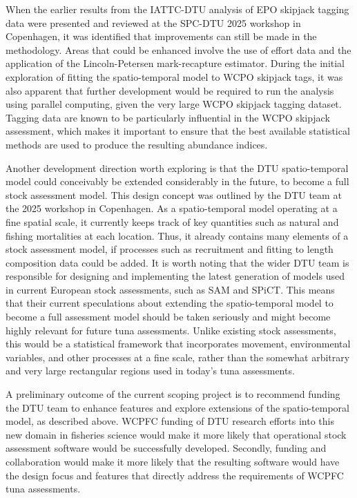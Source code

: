 \documentclass{SCreport}
\begin{document}
When the earlier results from the IATTC-DTU analysis of EPO skipjack tagging
data were presented and reviewed at the SPC-DTU 2025 workshop in Copenhagen, it
was identified that improvements can still be made in the methodology. Areas
that could be enhanced involve the use of effort data and the application of the
Lincoln-Petersen mark-recapture estimator. During the initial exploration of
fitting the spatio-temporal model to WCPO skipjack tags, it was also apparent
that further development would be required to run the analysis using parallel
computing, given the very large WCPO skipjack tagging dataset. Tagging data are
known to be particularly influential in the WCPO skipjack assessment, which
makes it important to ensure that the best available statistical methods are
used to produce the resulting abundance indices.

Another development direction worth exploring is that the DTU spatio-temporal
model could conceivably be extended considerably in the future, to become a full
stock assessment model. This design concept was outlined by the DTU team at the
2025 workshop in Copenhagen. As a spatio-temporal model operating at a fine
spatial scale, it currently keeps track of key quantities such as natural and
fishing mortalities at each location. Thus, it already contains many elements of
a stock assessment model, if processes such as recruitment and fitting to length
composition data could be added. It is worth noting that the wider DTU team is
responsible for designing and implementing the latest generation of models used
in current European stock assessments, such as SAM and SPiCT. This means that
their current speculations about extending the spatio-temporal model to become a
full assessment model should be taken seriously and might become highly relevant
for future tuna assessments. Unlike existing stock assessments, this would be a
statistical framework that incorporates movement, environmental variables, and
other processes at a fine scale, rather than the somewhat arbitrary and very
large rectangular regions used in today's tuna assessments.

A preliminary outcome of the current scoping project is to recommend funding the
DTU team to enhance features and explore extensions of the spatio-temporal
model, as described above. WCPFC funding of DTU research efforts into this new
domain in fisheries science would make it more likely that operational stock
assessment software would be successfully developed. Secondly, funding and
collaboration would make it more likely that the resulting software would have
the design focus and features that directly address the requirements of WCPFC
tuna assessments.
\end{document}
